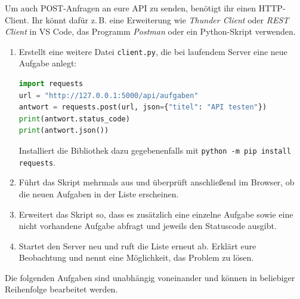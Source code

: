 \documentclass[11pt, a4paper, oneside]{article}
\begin{document}
	
	
	Um auch POST-Anfragen an eure API zu senden, benötigt ihr einen HTTP-Client.
	Ihr könnt dafür z.\,B. eine Erweiterung wie \emph{Thunder Client} oder \emph{REST Client} in VS Code, das Programm \emph{Postman} oder ein Python-Skript verwenden.
	
	\begin{enumerate}[label=\alph*)]
		\item Erstellt eine weitere Datei \texttt{client.py}, die bei laufendem Server eine neue Aufgabe anlegt:
        \begin{lstlisting}[language=python]
import requests
url = "http://127.0.0.1:5000/api/aufgaben"
antwort = requests.post(url, json={"titel": "API testen"})
print(antwort.status_code)
print(antwort.json())
        \end{lstlisting}
		Installiert die Bibliothek dazu gegebenenfalls mit \lstinline{python -m pip install requests}.

		\item Führt das Skript mehrmals aus und überprüft anschließend im Browser, ob die neuen Aufgaben in der Liste erscheinen.
		
		\item Erweitert das Skript so, dass es zusätzlich eine einzelne Aufgabe sowie eine nicht vorhandene Aufgabe abfragt und jeweils den Statuscode ausgibt.
		
		\item Startet den Server neu und ruft die Liste erneut ab.
		Erklärt eure Beobachtung und nennt eine Möglichkeit, das Problem zu lösen.
	\end{enumerate}

    \lines[5cm]
	
	
	
	Die folgenden Aufgaben sind unabhängig voneinander und können in beliebiger Reihenfolge bearbeitet werden.
	
\end{document}
